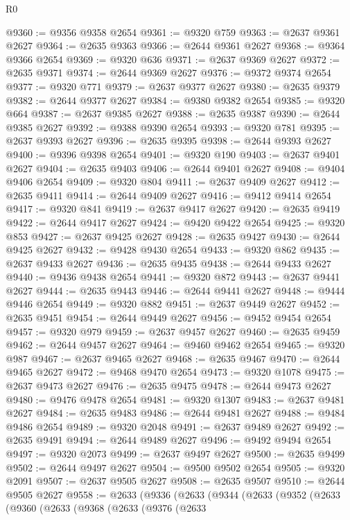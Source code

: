 \begin{lexlean}{R0}
\begin{coremodule}
@9360 := @9356 @9358 @2654
@9361 := @9320 @759
@9363 := @2637 @9361 @2627
@9364 := @2635 @9363
@9366 := @2644 @9361 @2627
@9368 := @9364 @9366 @2654
@9369 := @9320 @636
@9371 := @2637 @9369 @2627
@9372 := @2635 @9371
@9374 := @2644 @9369 @2627
@9376 := @9372 @9374 @2654
@9377 := @9320 @771
@9379 := @2637 @9377 @2627
@9380 := @2635 @9379
@9382 := @2644 @9377 @2627
@9384 := @9380 @9382 @2654
@9385 := @9320 @664
@9387 := @2637 @9385 @2627
@9388 := @2635 @9387
@9390 := @2644 @9385 @2627
@9392 := @9388 @9390 @2654
@9393 := @9320 @781
@9395 := @2637 @9393 @2627
@9396 := @2635 @9395
@9398 := @2644 @9393 @2627
@9400 := @9396 @9398 @2654
@9401 := @9320 @190
@9403 := @2637 @9401 @2627
@9404 := @2635 @9403
@9406 := @2644 @9401 @2627
@9408 := @9404 @9406 @2654
@9409 := @9320 @804
@9411 := @2637 @9409 @2627
@9412 := @2635 @9411
@9414 := @2644 @9409 @2627
@9416 := @9412 @9414 @2654
@9417 := @9320 @841
@9419 := @2637 @9417 @2627
@9420 := @2635 @9419
@9422 := @2644 @9417 @2627
@9424 := @9420 @9422 @2654
@9425 := @9320 @853
@9427 := @2637 @9425 @2627
@9428 := @2635 @9427
@9430 := @2644 @9425 @2627
@9432 := @9428 @9430 @2654
@9433 := @9320 @862
@9435 := @2637 @9433 @2627
@9436 := @2635 @9435
@9438 := @2644 @9433 @2627
@9440 := @9436 @9438 @2654
@9441 := @9320 @872
@9443 := @2637 @9441 @2627
@9444 := @2635 @9443
@9446 := @2644 @9441 @2627
@9448 := @9444 @9446 @2654
@9449 := @9320 @882
@9451 := @2637 @9449 @2627
@9452 := @2635 @9451
@9454 := @2644 @9449 @2627
@9456 := @9452 @9454 @2654
@9457 := @9320 @979
@9459 := @2637 @9457 @2627
@9460 := @2635 @9459
@9462 := @2644 @9457 @2627
@9464 := @9460 @9462 @2654
@9465 := @9320 @987
@9467 := @2637 @9465 @2627
@9468 := @2635 @9467
@9470 := @2644 @9465 @2627
@9472 := @9468 @9470 @2654
@9473 := @9320 @1078
@9475 := @2637 @9473 @2627
@9476 := @2635 @9475
@9478 := @2644 @9473 @2627
@9480 := @9476 @9478 @2654
@9481 := @9320 @1307
@9483 := @2637 @9481 @2627
@9484 := @2635 @9483
@9486 := @2644 @9481 @2627
@9488 := @9484 @9486 @2654
@9489 := @9320 @2048
@9491 := @2637 @9489 @2627
@9492 := @2635 @9491
@9494 := @2644 @9489 @2627
@9496 := @9492 @9494 @2654
@9497 := @9320 @2073
@9499 := @2637 @9497 @2627
@9500 := @2635 @9499
@9502 := @2644 @9497 @2627
@9504 := @9500 @9502 @2654
@9505 := @9320 @2091
@9507 := @2637 @9505 @2627
@9508 := @2635 @9507
@9510 := @2644 @9505 @2627
@9558 := @2633
    (@9336
      (@2633
        (@9344
          (@2633
            (@9352
              (@2633
                (@9360
                  (@2633
                    (@9368
                      (@2633
                        (@9376
                          (@2633

\end{coremodule}
\end{lexlean}
